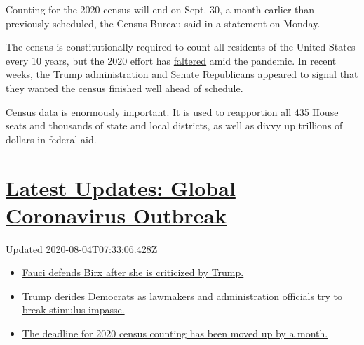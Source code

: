 Counting for the 2020 census will end on Sept. 30, a month earlier than
previously scheduled, the Census Bureau said in a statement on Monday.

The census is constitutionally required to count all residents of the
United States every 10 years, but the 2020 effort has
\href{https://www.nytimes3xbfgragh.onion/2020/04/18/us/coronavirus-census.html}{faltered}
amid the pandemic. In recent weeks, the Trump administration and Senate
Republicans
\href{https://www.nytimes3xbfgragh.onion/2020/07/28/us/trump-census.html}{appeared
to signal that they wanted the census finished well ahead of schedule}.

Census data is enormously important. It is used to reapportion all 435
House seats and thousands of state and local districts, as well as divvy
up trillions of dollars in federal aid.

\hypertarget{latest-updates-global-coronavirus-outbreak}{%
\section{\texorpdfstring{\href{https://www.nytimes3xbfgragh.onion/2020/08/03/world/coronavirus-covid-19.html?action=click\&pgtype=Article\&state=default\&region=MAIN_CONTENT_1\&context=storylines_live_updates}{Latest
Updates: Global Coronavirus
Outbreak}}{Latest Updates: Global Coronavirus Outbreak}}\label{latest-updates-global-coronavirus-outbreak}}

Updated 2020-08-04T07:33:06.428Z

\begin{itemize}
\tightlist
\item
  \href{https://www.nytimes3xbfgragh.onion/2020/08/03/world/coronavirus-covid-19.html?action=click\&pgtype=Article\&state=default\&region=MAIN_CONTENT_1\&context=storylines_live_updates\#link-4547638f}{Fauci
  defends Birx after she is criticized by Trump.}
\item
  \href{https://www.nytimes3xbfgragh.onion/2020/08/03/world/coronavirus-covid-19.html?action=click\&pgtype=Article\&state=default\&region=MAIN_CONTENT_1\&context=storylines_live_updates\#link-15e7f995}{Trump
  derides Democrats as lawmakers and administration officials try to
  break stimulus impasse.}
\item
  \href{https://www.nytimes3xbfgragh.onion/2020/08/03/world/coronavirus-covid-19.html?action=click\&pgtype=Article\&state=default\&region=MAIN_CONTENT_1\&context=storylines_live_updates\#link-e5a2cda}{The
  deadline for 2020 census counting has been moved up by a month.}
\end{itemize}

